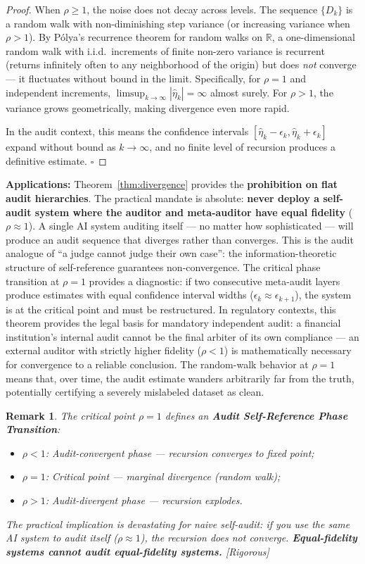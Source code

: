 \documentclass[12pt,a4paper]{article}
\newtheorem{remark}[theorem]{Remark}
\newcommand{\rigorous}{\textcolor{green!50!black}{\small\textsf{[Rigorous]}}}
\newcommand{\R}{\mathbb{R}}
\begin{document}
\begin{proof}
When $\rho\geq1$, the noise does not decay across levels.  The sequence
$\{D_k\}$ is a random walk with non-diminishing step variance (or increasing
variance when $\rho>1$).  By P\'olya's recurrence theorem for random walks on
$\R$, a one-dimensional random walk with i.i.d.\ increments of finite
non-zero variance is recurrent (returns infinitely often to any neighborhood
of the origin) but does \emph{not} converge — it fluctuates without bound in
the limit.  Specifically, for $\rho=1$ and independent increments,
$\limsup_{k\to\infty}|\hat{\eta}_k|=\infty$ almost surely.  For $\rho>1$,
the variance grows geometrically, making divergence even more rapid.

In the audit context, this means the confidence intervals
$[\hat{\eta}_k-\epsilon_k,\hat{\eta}_k+\epsilon_k]$ expand without bound as
$k\to\infty$, and no finite level of recursion produces a definitive estimate.
$\square$
\end{proof}

\medskip\noindent
\textbf{Applications:}
Theorem~\ref{thm:divergence} provides the \textbf{prohibition on flat audit
hierarchies}.  The practical mandate is absolute: \textbf{never deploy a
self-audit system where the auditor and meta-auditor have equal fidelity}
($\rho\approx1$).  A single AI system auditing itself — no matter how
sophisticated — will produce an audit sequence that diverges rather than
converges.  This is the audit analogue of ``a judge cannot judge their own
case'': the information-theoretic structure of self-reference guarantees
non-convergence.  The critical phase transition at $\rho=1$ provides a
diagnostic: if two consecutive meta-audit layers produce estimates with
equal confidence interval widths ($\epsilon_k\approx\epsilon_{k+1}$), the
system is at the critical point and must be restructured.  In regulatory
contexts, this theorem provides the legal basis for mandatory independent
audit: a financial institution's internal audit cannot be the final arbiter
of its own compliance — an external auditor with strictly higher fidelity
($\rho<1$) is mathematically necessary for convergence to a reliable
conclusion.  The random-walk behavior at $\rho=1$ means that, over time,
the audit estimate wanders arbitrarily far from the truth, potentially
certifying a severely mislabeled dataset as clean.

\begin{remark}
The critical point $\rho=1$ defines an \textbf{Audit Self-Reference Phase
Transition}:
\begin{itemize}
    \item $\rho<1$: Audit-convergent phase — recursion converges to fixed point;
    \item $\rho=1$: Critical point — marginal divergence (random walk);
    \item $\rho>1$: Audit-divergent phase — recursion explodes.
\end{itemize}
The practical implication is devastating for naive self-audit: if you use the
\emph{same} AI system to audit itself ($\rho\approx1$), the recursion does not
converge.  \textbf{Equal-fidelity systems cannot audit equal-fidelity systems.}
\rigorous
\end{remark}
\end{document}
